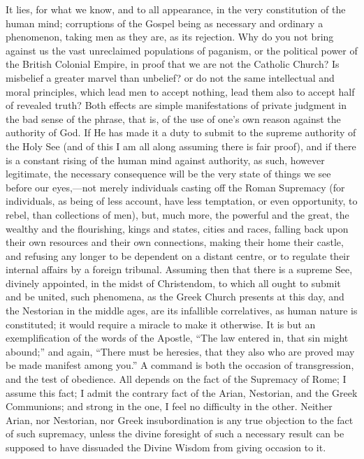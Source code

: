 It lies, for what we know, and to all appearance, in the very
constitution of the human mind; corruptions of the Gospel being as
necessary and ordinary a phenomenon, taking men as they are, as its
rejection. Why do you not bring against us the vast unreclaimed
populations of paganism, or the political power of the British
Colonial Empire, in proof that we are not the Catholic Church? Is
misbelief a greater marvel than unbelief? or do not the same
intellectual and moral principles, which lead men to accept nothing,
lead them also to accept half of revealed truth? Both effects are
simple manifestations of private judgment in the bad sense of the
phrase, that is, of the use of one's own reason against the authority
of God. If He has made it a duty to submit to the supreme authority of
the Holy See (and of this I am all along assuming there is fair
proof), and if there is a constant rising of the human mind against
authority, as such, however legitimate, the necessary consequence will
be the very state of things we see before our eyes,—not merely
individuals casting off the Roman Supremacy (for individuals, as being
of less account, have less temptation, or even opportunity, to rebel,
than collections of men), but, much more, the powerful and the great,
the wealthy and the flourishing, kings and states, cities and races,
falling back upon their own resources and their own connections,
making their home their castle, and refusing any longer to be
dependent on a distant centre, or to regulate their internal affairs
by a foreign tribunal. Assuming then that there is a supreme See,
divinely appointed, in the midst of Christendom, to which all ought to
submit and be united, such phenomena, as the Greek Church presents at
this day, and the Nestorian in the middle ages, are its infallible
correlatives, as human nature is constituted; it would require a
miracle to make it otherwise. It is but an exemplification of the
words of the Apostle, ``The law entered in, that sin might
abound;'' and again, ``There must be heresies, that they also
who are proved may be made manifest among you.'' A command is both
the occasion of transgression, and the test of obedience. All depends
on the fact of the Supremacy of Rome; I assume this fact; I admit the
contrary fact of the Arian, Nestorian, and the Greek Communions; and
strong in the one, I feel no difficulty in the other. Neither Arian,
nor Nestorian, nor Greek insubordination is any true objection to the
fact of such supremacy, unless the divine foresight of such a
necessary result can be supposed to have dissuaded the Divine Wisdom
from giving occasion to it.

